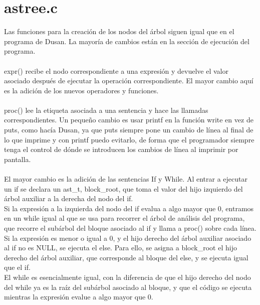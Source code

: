 \documentclass{article}
\begin{document}
\section{astree.c}
Las funciones para la creación de los nodos del árbol siguen igual que en el programa de Dusan. La mayoría de cambios están en la sección de ejecución del programa.\\\\
expr() recibe el nodo correspondiente a una expresión y devuelve el valor asociado después de ejecutar la operación correspondiente. El mayor cambio aquí es la adición de los nuevos operadores y funciones.\\\\
proc() lee la etiqueta asociada a una sentencia y hace las llamadas correspondientes. Un pequeño cambio es usar printf en la función write en vez de puts, como hacía Dusan, ya que puts siempre pone un cambio de línea al final de lo que imprime y con printf puedo evitarlo, de forma que el programador siempre tenga el control de dónde se introducen los cambios de línea al imprimir por pantalla.\\\\
El mayor cambio es la adición de las sentencias If y While. Al entrar a ejecutar un if se declara un ast\_t, block\_root, que toma el valor del hijo izquierdo del árbol auxiliar a la derecha del nodo del if.\\
Si la expresión a la izquierda del nodo del if evalua a algo mayor que 0, entramos en un while igual al que se usa para recorrer el árbol de análisis del programa, que recorre el subárbol del bloque asociado al if y llama a proc() sobre cada línea.\\
Si la expresión es menor o igual a 0, y el hijo derecho del árbol auxiliar asociado al if no es NULL, se ejecuta el else. Para ello, se asigna a block\_root el hijo derecho del árbol auxiliar, que corresponde al bloque del else, y se ejecuta igual que el if.\\

El while es esencialmente igual, con la diferencia de que el hijo derecho del nodo del while ya es la raíz del subárbol asociado al bloque, y que el código se ejecuta mientras la expresión evalue a algo mayor que 0.
\end{document}
